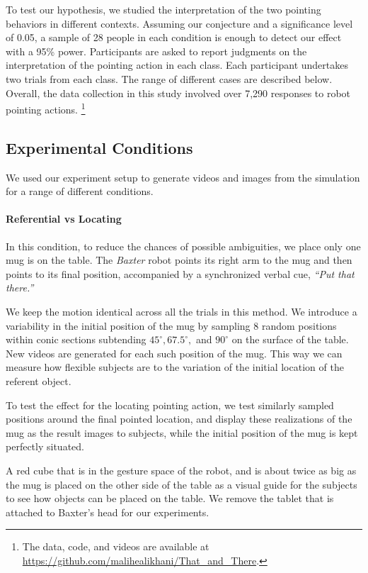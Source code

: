 \documentclass[letterpaper]{article} %
\begin{document}
To test our hypothesis, we studied the interpretation of the two pointing behaviors in different contexts. Assuming our conjecture and a significance level of 0.05, a sample of 28 people in each condition is enough to detect our effect with a 95\% power.  Participants are asked to report judgments on the interpretation of the pointing action in each class.  Each participant undertakes two trials from each class.  The range of different cases are described below.  Overall, the data collection in this study involved over 7,290 responses to robot pointing actions. \footnote{ The data, code, and videos are available at  \url{https://github.com/malihealikhani/That_and_There}.}

\subsection{Experimental Conditions}

We used our experiment setup to generate videos and images from the simulation for a range of different conditions.

\paragraph{Referential vs Locating}
In this condition, to reduce the chances of possible ambiguities, we place only one mug is on the table. The \textit{Baxter} robot points its right arm to the mug and then points to its final position, accompanied by a synchronized verbal cue, \textit{``Put that there.''}

We keep the motion identical across all the trials in this method. 
We introduce a variability in the initial position of the mug by sampling $8$ random positions within conic sections subtending $45^{\circ} , 67.5^{\circ}, $ and $90^{\circ}$ on the surface of the table. New videos are generated for each such position of the mug.
This way we can measure how flexible subjects are to the variation of the initial location of the referent object. 

To test the effect for the locating pointing action, we test similarly sampled positions around the final pointed location, and display these realizations of the mug as the result images to subjects, while the initial position of the mug is kept perfectly situated. 

A red cube that is in the gesture space of the robot, and is about twice as big as the mug is placed on the other side of the table as a visual guide for the subjects to see how objects can be placed on the table. We remove the tablet that is attached to Baxter's head for our experiments.\\ 
\end{document}
